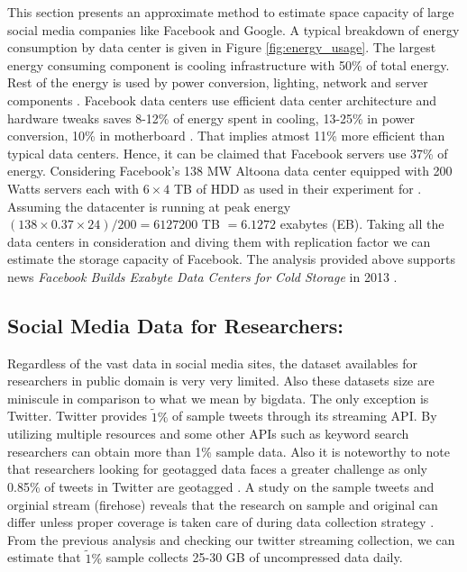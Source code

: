 This section presents an approximate method to estimate space capacity of large social media companies like Facebook and Google.
A typical breakdown of energy consumption by data center is given in Figure \ref{fig:energy_usage}.
The largest energy consuming component is cooling infrastructure with 50\% of total energy. Rest of the energy is used by power conversion, lighting, network and server components \cite{info2007top, dayarathna2016data}. Facebook data centers use efficient data center architecture and hardware tweaks  saves
8-12\% of energy spent in cooling, 13-25\% in power conversion, 10\% in motherboard \cite{frachtenberg2011high}. That implies atmost 11\%  more efficient than typical data centers. Hence, it can be claimed that Facebook servers use 37\% of energy. Considering Facebook's 138 MW Altoona data center equipped with 200 Watts servers each with $6\times4$ TB of HDD as used in their experiment for \cite{frachtenberg2011high}. Assuming the datacenter is running at peak energy $(138 \times 0.37 \times 24)/ 200 = 6127200$  TB $= 6.1272$ exabytes (EB).
Taking all the data centers in consideration and diving them with replication factor we can estimate the storage capacity of Facebook. The analysis provided above supports news {\em Facebook Builds Exabyte Data Centers for Cold Storage} in 2013 \cite{facebook_support}.


\subsection*{Social Media Data for Researchers:}
Regardless of the vast data in social media sites, the dataset availables for researchers in public domain is very very limited. Also these datasets size are miniscule in comparison to what we mean by bigdata. The only exception is Twitter. Twitter provides $\tilde 1\%$ of sample tweets through its streaming API. By utilizing multiple resources and some other APIs such as keyword search researchers can obtain more than 1\% sample data. Also it is noteworthy to note that researchers looking for geotagged data faces a greater challenge as only 0.85\% of tweets in Twitter are geotagged \cite{sloan2013knowing}. A study on the sample tweets and orginial stream (firehose) reveals that the research on sample and original can differ unless proper coverage is taken care of during data collection strategy  \cite{morstatter2013sample}. From the previous analysis and checking our twitter streaming collection, we can estimate that $\tilde 1\%$ sample collects 25-30 GB of uncompressed data daily.

